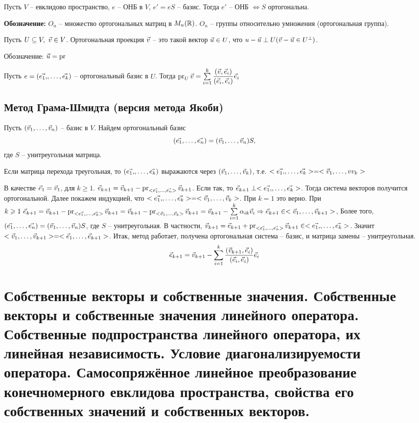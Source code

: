 \begin{multicols}{2}
\begin{proposition}{}{}
    Пусть $V$ -- евклидово пространство, $e$ -- ОНБ в $V$, $e' = eS$ -- базис. Тогда $e'$ -- ОНБ $\Leftrightarrow S$ ортогональна. 
\end{proposition}
\textbf{Обозначение: } $O_n$ -- множество ортогональных матриц в $M_n(\mathbb{R})$. $O_n$ -- группы относительно умножения (ортогональная группа).
\begin{definition}{}{}
    Пусть $U \subseteq V, \ \vec{v} \in V$. Ортогональная проекция $\vec{v}$ -- это такой вектор $\vec{u} \in U$, что $u-\vec{u} \perp U (\vec{v} - \vec{u} \in U^\perp)$.\par Обозначение: $\vec{u} = \operatorname{pr}$
\end{definition}
\begin{proposition}{}{}
    Пусть $e = (\vec{e_1,}, \ldots, \vec{e_k})$ -- ортогональный базис в $U$. Тогда $\operatorname{pr}_U\vec{v} = \sum\limits_{i=1}^k \dfrac{(\vec{v}, \vec{e}_i)}{(\vec{e}_i, \vec{e}_i)}\vec{e}_i$ 
\end{proposition}
\subsection*{Метод Грама-Шмидта (версия метода Якоби)}
Пусть $(\vec{v}_1, \ldots, \vec{v}_n)$ -- базис в $V$. Найдем ортогональный базис \[
    (\vec{e_1}, \ldots, \vec{e_n}) = (\vec{v}_1, \ldots, \vec{v}_n)S,
    \]
где $S$ -- унитреугольная матрица.
\begin{note}{}{}
    Если матрица перехода треугольная, то $(\vec{e_1,}, \ldots, \vec{e_k})$ выражаются через $(\vec{v}_1, \ldots, \vec{v}_k)$, т.е. $<\vec{e_1,}, \ldots, \vec{e_k}> = <\vec{v}_1, \ldots, 
    vv_k>$
\end{note}
В качестве $\vec{e}_1 = \vec{v}_1$, для $k\geq 1$. $\vec{e}_{k+1} = \vec{v}_{k+1} - \operatorname{pr}_{<\vec{e_1}, \ldots, \vec{e_n}>}\vec{v}_{k+1}$. Если так, то $\vec{e}_{k+1} \perp <\vec{e_1,}, \ldots, \vec{e_k}>$. Тогда система векторов получится ортогональной. Далее покажем индукцией, что $<\vec{e_1,}, \ldots, \vec{e_k}> = <\vec{v}_1, \ldots, \vec{v}_k>$. При $k=1$ это верно. При $k\geqslant 1 \ \vec{e}_{k+1} = \vec{v}_{k+1} - \operatorname{pr}_{<\vec{e_1,}, \ldots, \vec{e_k}>}\vec{v}_{k+1} = \vec{v}_{k+1}-\operatorname{pr}_{<\vec{v}_1, \ldots, \vec{v}_k>}\vec{v}_{k+1} = \vec{v}_{k+1} - \sum\limits_{i=1}^k \alpha_{ik}\vec{v}_i \Rightarrow \vec{e}_{k+1} \in <\vec{v}_1, \ldots, \vec{v}_{k+1}>$, Более того, $(\vec{e_1}, \ldots, \vec{e_n}) = (\vec{v}_1, \ldots, \vec{v}_n)S$, где $S$ -- унитреугольная. В частности, $\vec{v}_{k+1} = \vec{e}_{k+1} + \operatorname{pr}_{<\vec{e_1}, \ldots, \vec{e_n}>} \vec{v}_{k+1} \in <\vec{e_1,}, \ldots, \vec{e_k}>$. Значит $<\vec{v}_1, \ldots, \vec{v}_{k+1}> = <\vec{e}_1, \ldots, \vec{e}_{k+1}>$. Итак, метод работает, получена ортогональная система -- базис, и матрица замены -- унитреугольная.
\[
    \vec{e}_{k+1} = \vec{v}_{k+1} - \sum\limits_{i=1}^k \dfrac{(\vec{v}_{k+1}, \vec{e}_i)}{(\vec{e}_i, \vec{e}_i)}\vec{e}_i
    \]
\section{Собственные векторы и собственные значения. Собственные векторы и собственные
значения линейного оператора. Собственные подпространства линейного оператора, их
линейная независимость. \mbox{Условие} диагонализируемости оператора. Самосопряжённое
линейное преобразование конечномерного евклидова пространства, свойства его
собственных значений и \mbox{собственных} векторов.}
\end{multicols}
